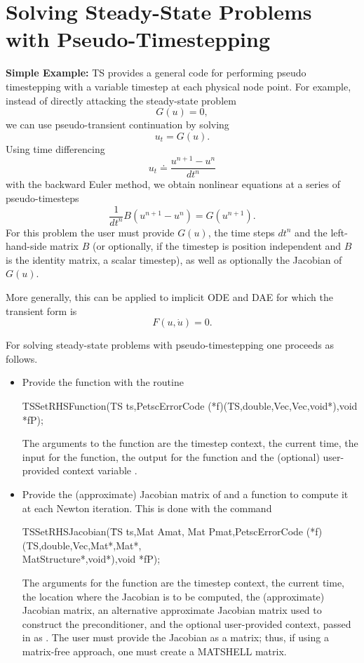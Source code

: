 \chapter{Solving Steady-State Problems with Pseudo-Timestepping}

\vspace{.2cm}

\noindent
{\bf Simple Example:}
TS provides a general code for performing pseudo timestepping
with a variable timestep at each physical node point. For example, instead of
directly attacking the steady-state problem
\[
           G(u) = 0,
\]
we can use pseudo-transient continuation by solving
\[
           u_t = G(u).
\]
Using time differencing
\[
   u_t \doteq \frac{{u^{n+1}} - {u^{n}} }{dt^{n}}
\]
with the backward Euler method, we obtain
nonlinear equations at a series of pseudo-timesteps
\[
           \frac{1}{dt^n} B (u^{n+1} - u^{n} ) = G(u^{n+1}).
\]
For this problem the user must provide $G(u)$,
the time steps $dt^{n}$ and the left-hand-side matrix $B$
(or optionally, if the timestep is position independent and $B$ is the
identity matrix,
a scalar timestep), as well as optionally the Jacobian of $G(u)$.

More generally, this can be applied to implicit ODE and DAE for which
the transient form is
\[
  F(u,\dot{u}) = 0.
\]

For solving steady-state problems with pseudo-timestepping one proceeds
as follows.
\begin{itemize}
\item Provide the function  with the routine
\begin{tabbing}
 TSSetRHSFunction(TS ts,PetscErrorCode (*f)(TS,double,Vec,Vec,void*),void *fP);
\end{tabbing}
The  arguments to the function  are
the timestep context, the current time, the input for the function,
the output for the function and the (optional) user-provided context
variable .

\item Provide the (approximate) Jacobian matrix of  and a
function to compute it at each Newton iteration. This is done with the command
\begin{tabbing}
 TSSetRHSJacobian(\=TS ts,Mat Amat, Mat Pmat,PetscErrorCode (*f)(TS,double,Vec,Mat*,Mat*,\\
                  \>        MatStructure*,void*),void *fP);
\end{tabbing}
The  arguments for the function  are
the timestep context, the current time, the location where the
Jacobian is to be computed, the (approximate) Jacobian matrix, an alternative
approximate Jacobian matrix used to construct the preconditioner, and the optional
user-provided context, passed in as . The user must provide the
Jacobian as a matrix; thus, if using a matrix-free approach, one
must create a MATSHELL matrix.
\end{itemize}


